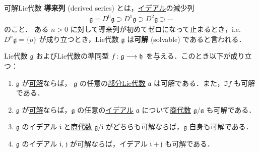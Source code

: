 \documentclass[rep_main]{subfiles}
\begin{document}
\begin{mydef}[label=def:solvable-LieAlg]{可解Lie代数}
    \textbf{導来列} (derived series) とは，\hyperref[def:ideal-LieAlg]{イデアル}の減少列
    \begin{align}
        \mathfrak{g} = D^0 \mathfrak{g} \supset D^1 \mathfrak{g} \supset D^2 \mathfrak{g} \supset \cdots
    \end{align}
    のこと．
    ある $n > 0$ に対して導来列が初めてゼロになって止まるとき，i.e. $D^n \mathfrak{g} = \{o\}$ が成り立つとき，Lie代数 $\mathfrak{g}$ は\textbf{可解} (solvable) であると言われる．
\end{mydef}

\begin{myprop}[label=prop:solvable-basic]{}
    Lie代数 $\mathfrak{g}$ およびLie代数の準同型 $f \colon \mathfrak{g} \longrightarrow \mathfrak{h}$ を与える．このとき以下が成り立つ：
    \begin{enumerate}
        \item $\mathfrak{g}$ が\hyperref[def:solvable-LieAlg]{可解}ならば，
        $\mathfrak{g}$ の任意の\hyperref[def:subLieAlg]{部分Lie代数} $\mathfrak{a}$ は可解である．また，$\Im f$ も可解である．
        \item $\mathfrak{g}$ が\hyperref[def:solvable-LieAlg]{可解}ならば，$\mathfrak{g}$ の任意の\hyperref[def:ideal-LieAlg]{イデアル} $\mathfrak{a}$ について\hyperref[def:quotient-LieAlg]{商代数} $\mathfrak{g} / \mathfrak{a}$ も可解である．
        \item $\mathfrak{g}$ のイデアル $\mathfrak{i}$ と\hyperref[def:quotient-LieAlg]{商代数} $\mathfrak{g}/\mathfrak{i}$ がどちらも可解ならば，$\mathfrak{g}$ 自身も可解である．
        \item $\mathfrak{g}$ のイデアル $\mathfrak{i},\, \mathfrak{j}$ が可解ならば，イデアル $\mathfrak{i} + \mathfrak{j}$ も可解である．
    \end{enumerate}
\end{myprop}
\end{document}
